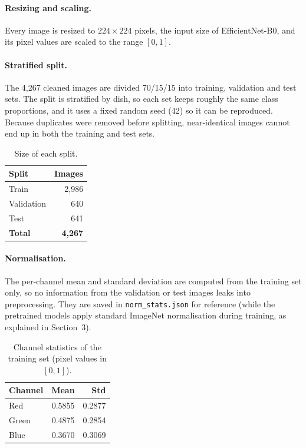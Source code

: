 \paragraph{Resizing and scaling.} Every image is resized to $224 \times 224$ pixels, the input size of EfficientNet-B0, and its pixel values are scaled to the range $[0,1]$.

\paragraph{Stratified split.} The 4,267 cleaned images are divided 70/15/15 into training, validation and test sets. The split is stratified by dish, so each set keeps roughly the same class proportions, and it uses a fixed random seed (42) so it can be reproduced. Because duplicates were removed before splitting, near-identical images cannot end up in both the training and test sets.

\begin{table}[H]
  \centering
  \begin{tabular}{|l|r|}
    \hline
    \textbf{Split} & \textbf{Images} \\
    \hline
    Train      & 2,986 \\
    Validation & 640 \\
    Test       & 641 \\
    \hline
    \textbf{Total} & \textbf{4,267} \\
    \hline
  \end{tabular}
  \caption{Size of each split.}
\end{table}

\paragraph{Normalisation.} The per-channel mean and standard deviation are computed from the training set only, so no information from the validation or test images leaks into preprocessing. They are saved in \texttt{norm\_stats.json} for reference (while the pretrained models apply standard ImageNet normalisation during training, as explained in Section~3).

\begin{table}[H]
  \centering
  \begin{tabular}{|l|r|r|}
    \hline
    \textbf{Channel} & \textbf{Mean} & \textbf{Std} \\
    \hline
    Red   & 0.5855 & 0.2877 \\
    Green & 0.4875 & 0.2854 \\
    Blue  & 0.3670 & 0.3069 \\
    \hline
  \end{tabular}
  \caption{Channel statistics of the training set (pixel values in $[0,1]$).}
\end{table}

